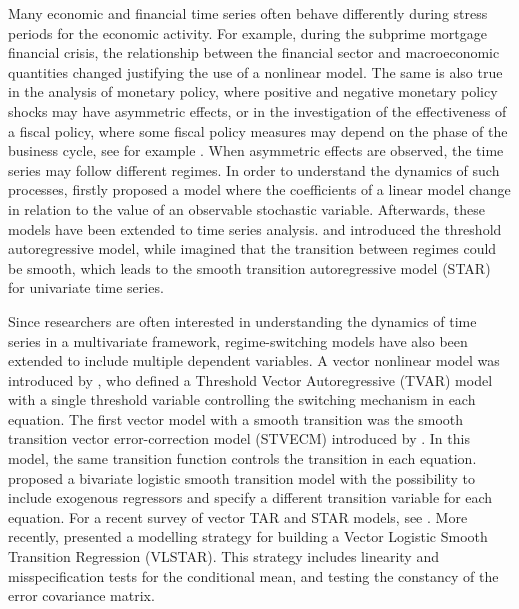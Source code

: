 Many economic and financial time series often behave differently during stress periods for the economic activity. For example, during the subprime mortgage financial crisis, the relationship between the financial sector and macroeconomic quantities changed justifying the use of a nonlinear model. The same is also true in the analysis of monetary policy, where positive and negative monetary policy shocks may have asymmetric effects, or in the investigation of the effectiveness of a fiscal policy, where some fiscal policy measures may depend on the phase of the business cycle, see for example \cite{Caggiano2015}. When asymmetric effects are observed, the time series may follow different regimes. In order to understand the dynamics of such processes, \citet*{qua58, qua60} firstly proposed a model where the coefficients of a linear model change in relation to the value of an observable stochastic variable.  Afterwards, these models have been extended to time series analysis. \citet*{ton78} and \citet*{toli80} introduced the threshold autoregressive model, while \citet*{tera94} imagined that the transition between regimes could be smooth, which leads to the smooth transition autoregressive model (STAR) for univariate time series. 


Since researchers are often interested in understanding the dynamics of time series in a multivariate framework, regime-switching models have also been extended to include multiple dependent variables. A vector nonlinear model was introduced by \citet*{tsa98}, who defined a Threshold Vector Autoregressive (TVAR) model with a single threshold variable controlling the switching mechanism in each equation. The first vector model with a smooth transition was the smooth transition vector error-correction model (STVECM) introduced by \citet*{rovafra01}. In this model, the same transition function controls the transition in each equation. \citet*{cama:2004} proposed a bivariate logistic smooth transition model with the possibility to include exogenous regressors and specify a different transition variable for each equation. For a recent survey of vector TAR and STAR models, see \citet*{hute13}. More recently, \citet*{teraya14} presented a modelling strategy for building a Vector Logistic Smooth Transition Regression (VLSTAR). This strategy includes linearity and misspecification tests for the conditional mean, and testing the constancy of the error covariance matrix. 

